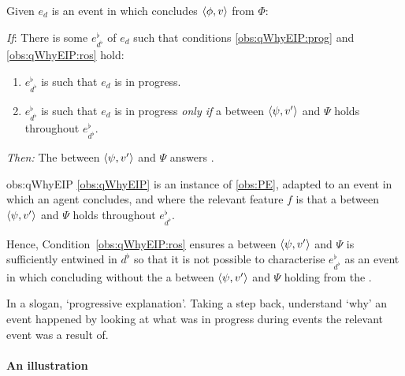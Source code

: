 \begin{note}
  \begin{condition}%
    \label{obs:qWhyEIP}%
    Given \(e_{d}\) is an event in which \vAgent{} concludes \(\langle \phi, v \rangle\) from \(\Phi\):

    \begin{itenum}
    \item[\emph{If}:]
      There is some \se{} \(e^{\flat}_{d^{\flat}}\) of \(e_{d}\) such that conditions \ref{obs:qWhyEIP:prog} and \ref{obs:qWhyEIP:ros} hold:
      \begin{enumerate}[label=\arabic*., ref=(\arabic*)]
      \item
        \label{obs:qWhyEIP:prog}
        \(e^{\flat}_{d^{\flat}}\) is such that \(e_{d}\) is in progress.
      \item
        \label{obs:qWhyEIP:ros}
        \(e^{\flat}_{d^{\flat}}\) is such that \(e_{d}\) is in progress \emph{only if} a \ros{} between \(\langle \psi, v' \rangle\) and \(\Psi\) holds throughout \(e^{\flat}_{d^{\flat}}\).
      \end{enumerate}
    \item[\emph{Then:}]
      The \ros{} between \(\langle \psi, v' \rangle\) and \(\Psi\) answers \qWhy{}.
    \end{itenum}
    \vspace{-2\baselineskip}
  \end{condition}

  \begin{motivation}{obs:qWhyEIP}
    \autoref{obs:qWhyEIP} is an instance of \autoref{obs:PE}, adapted to an event in which an agent concludes, and where the relevant feature \(f\) is that a \ros{} between \(\langle \psi, v' \rangle\) and \(\Psi\) holds throughout \(e^{\flat}_{d^{\flat}}\).

  Hence, Condition~\ref{obs:qWhyEIP:ros} ensures a \ros{} between \(\langle \psi, v' \rangle\) and \(\Psi\) is sufficiently entwined in \(d^{\flat}\) so that it is not possible to characterise \(e^{\flat}_{d^{\flat}}\) as an event in which concluding without the a \ros{} between \(\langle \psi, v' \rangle\) and \(\Psi\) holding from the \agpe{}.
\end{motivation}

  \noindent%
  In a slogan, `progressive explanation'.
  Taking a step back, understand `why' an event happened by looking at what was in progress during events the relevant event was a result of.
\end{note}

\paragraph{An illustration}

